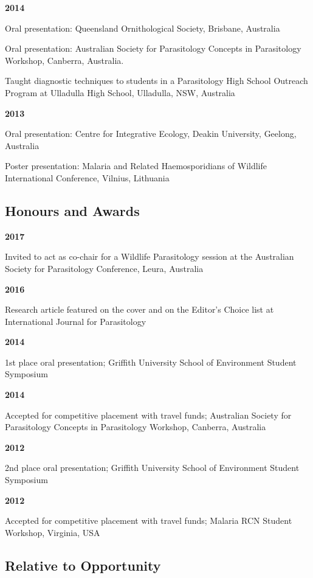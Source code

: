 \documentclass[]{article}
\begin{document}
\textbf{2014}

Oral presentation: Queensland Ornithological Society, Brisbane,
Australia

Oral presentation: Australian Society for Parasitology Concepts in
Parasitology Workshop, Canberra, Australia.

Taught diagnostic techniques to students in a Parasitology High School
Outreach Program at Ulladulla High School, Ulladulla, NSW, Australia

\textbf{2013}

Oral presentation: Centre for Integrative Ecology, Deakin University,
Geelong, Australia

Poster presentation: Malaria and Related Haemosporidians of Wildlife
International Conference, Vilnius, Lithuania

\subsection{Honours and Awards}\label{honours-and-awards}

\textbf{2017}

Invited to act as co-chair for a Wildlife Parasitology session at the
Australian Society for Parasitology Conference, Leura, Australia

\textbf{2016}

Research article featured on the cover and on the Editor's Choice list
at International Journal for Parasitology

\textbf{2014}

1st place oral presentation; Griffith University School of Environment
Student Symposium

\textbf{2014}

Accepted for competitive placement with travel funds; Australian Society
for Parasitology Concepts in Parasitology Workshop, Canberra, Australia

\textbf{2012}

2nd place oral presentation; Griffith University School of Environment
Student Symposium

\textbf{2012}

Accepted for competitive placement with travel funds; Malaria RCN
Student Workshop, Virginia, USA

\subsection{Relative to Opportunity}\label{relative-to-opportunity}
\end{document}
